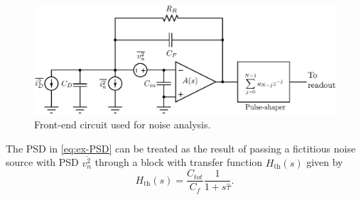 \begin{figure}[!t]
	\centering
	\includegraphics[width=5in]{./Figures/front-end.eps}
	\caption{Front-end circuit used for noise analysis.}\label{fig:analysis-circuit}
\end{figure}

The PSD in \eqref{eq:ex-PSD} can be treated as the result of passing a fictitious noise source with PSD $\overline{v_n^2}$ through a block with transfer function $H_\text{th}(s)$ given by
	\begin{equation} 
		H_\text{th}(s) =  \frac{C_{tot}}{C_f}\frac{1}{1+s\hat{\tau}}. \label{eq:exampletf}
	\end{equation}

